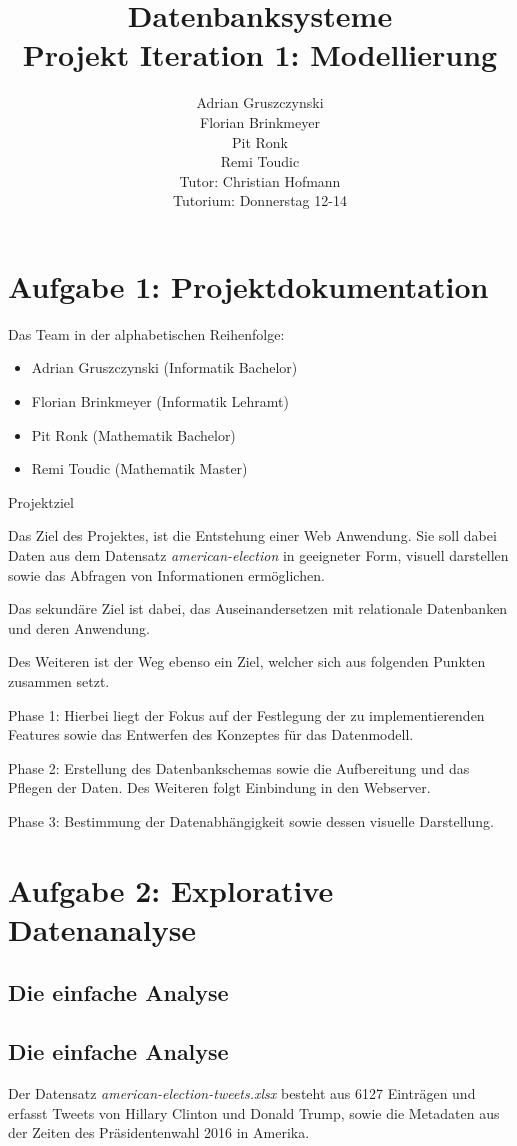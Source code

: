 \documentclass[12pt]{article}
\title{Datenbanksysteme\\
			 Projekt Iteration 1: Modellierung}
\author{Adrian Gruszczynski\\ 
			Florian Brinkmeyer \\ %
			Pit Ronk\\ %
			Remi Toudic\\ %
		Tutor: Christian Hofmann\\
		Tutorium: Donnerstag 12-14}
\begin{document}
\maketitle
\section*{Aufgabe 1: Projektdokumentation}
Das Team in der alphabetischen Reihenfolge:
\begin{itemize}
\item Adrian Gruszczynski (Informatik Bachelor)
\item Florian Brinkmeyer (Informatik Lehramt)
\item Pit Ronk (Mathematik Bachelor)
\item Remi Toudic (Mathematik Master)
\end{itemize}


Projektziel 


Das Ziel des Projektes, ist die Entstehung einer Web Anwendung. Sie soll dabei Daten aus dem Datensatz \textit{american-election} in geeigneter Form, visuell darstellen sowie das Abfragen von Informationen ermöglichen. 

Das sekundäre Ziel ist dabei, das Auseinandersetzen mit relationale Datenbanken und deren Anwendung. 


Des Weiteren ist der Weg ebenso ein Ziel, welcher sich aus folgenden Punkten zusammen setzt. 

Phase 1: 
Hierbei liegt der Fokus auf der Festlegung der zu implementierenden Features sowie das Entwerfen des Konzeptes für das Datenmodell. 

Phase 2: 
Erstellung des Datenbankschemas sowie die Aufbereitung und das Pflegen der Daten. Des Weiteren folgt Einbindung in den Webserver.

Phase 3:
Bestimmung der Datenabhängigkeit sowie dessen visuelle Darstellung. 


\section*{Aufgabe 2: Explorative Datenanalyse}
\subsection*{Die einfache Analyse}
\subsection*{Die einfache Analyse}
Der Datensatz \textit{american-election-tweets.xlsx} besteht aus 6127 Einträgen und erfasst Tweets von Hillary Clinton und Donald Trump, sowie die Metadaten aus der Zeiten des Präsidentenwahl 2016 in Amerika.
\end{document}
